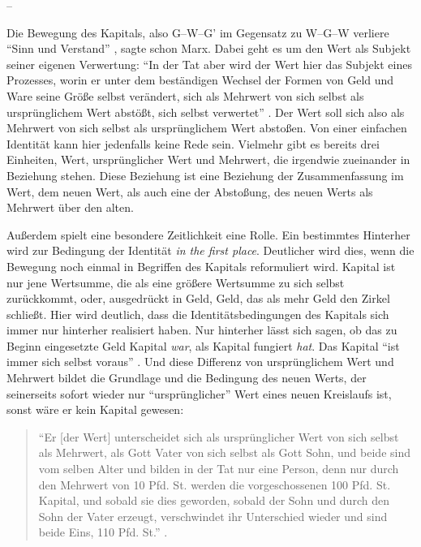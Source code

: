 \documentclass[12pt,
               DIV13,
               paper=a4,
               twoside=false,
               onehalfspacing,
               bibliography=totoc,
               toc=graduated,
               draft,
               ]{scrartcl}
\newcommand{\pc}[2]{\parencite[#1]{#2}}
\newcommand{\worries}[1]{\ifdraft{\textcolor{blue}{\texttt{(#1)}}}{}}
\newcommand{\gwg}{G--W--G'\xspace}
\newcommand{\wgw}{W--G--W\xspace}
\begin{document}
--

Die Bewegung des Kapitals, also \gwg im Gegensatz zu \wgw verliere
"`Sinn und Verstand"' \pc{166}{kap}, sagte schon Marx. Dabei geht es
um den Wert als Subjekt seiner eigenen Verwertung: "`In der Tat aber
wird der Wert hier das Subjekt eines Prozesses, worin er unter dem
beständigen Wechsel der Formen von Geld und Ware seine Größe selbst
verändert, sich als Mehrwert von sich selbst als ursprünglichem Wert
abstößt, sich selbst verwertet"' \pc{169}{kap}. Der Wert soll sich
also als Mehrwert von sich selbst als ursprünglichem Wert abstoßen.
Von einer einfachen Identität kann hier jedenfalls keine Rede sein.
Vielmehr gibt es bereits drei Einheiten, Wert, ursprünglicher Wert und
Mehrwert, die irgendwie zueinander in Beziehung stehen. Diese
Beziehung ist eine Beziehung der Zusammenfassung im Wert, dem neuen
Wert, als auch eine der Abstoßung, des neuen Werts als Mehrwert über
den alten.

Außerdem spielt eine besondere Zeitlichkeit eine Rolle. Ein bestimmtes
Hinterher wird zur Bedingung der Identität \emph{in the first place}.
Deutlicher wird dies, wenn die Bewegung noch einmal in Begriffen des
Kapitals reformuliert wird. Kapital ist nur jene Wertsumme, die als
eine größere Wertsumme zu sich selbst zurückkommt, oder, ausgedrückt
in Geld, Geld, das als mehr Geld den Zirkel schließt. \worries{Falte}
Hier wird deutlich, dass die Identitätsbedingungen des Kapitals sich
immer nur hinterher realisiert haben. Nur hinterher lässt sich sagen,
ob das zu Beginn eingesetzte Geld Kapital \emph{war}, als Kapital
fungiert \emph{hat}. Das Kapital "`ist immer sich selbst voraus"'
\pc{125}{strauss}. Und diese Differenz von ursprünglichem Wert und
Mehrwert bildet die Grundlage und die Bedingung des neuen Werts, der
seinerseits sofort wieder nur "`ursprünglicher"' Wert eines neuen
Kreislaufs ist, sonst wäre er kein Kapital gewesen:
%
\begin{spacing}{1}
\begin{quote}
"`Er [der Wert] unterscheidet sich als ursprünglicher
Wert von sich selbst als Mehrwert, als Gott Vater von sich selbst als
Gott Sohn, und beide sind vom selben Alter und bilden in der Tat nur
eine Person, denn nur durch den Mehrwert von 10 Pfd. St. werden die
vorgeschossenen 100 Pfd. St. Kapital, und sobald sie dies geworden,
sobald der Sohn und durch den Sohn der Vater erzeugt, verschwindet ihr
Unterschied wieder und sind beide Eins, 110 Pfd. St."' \pc{S. 169
f.}{kap}.
\end{quote}
\end{spacing}
\end{document}

